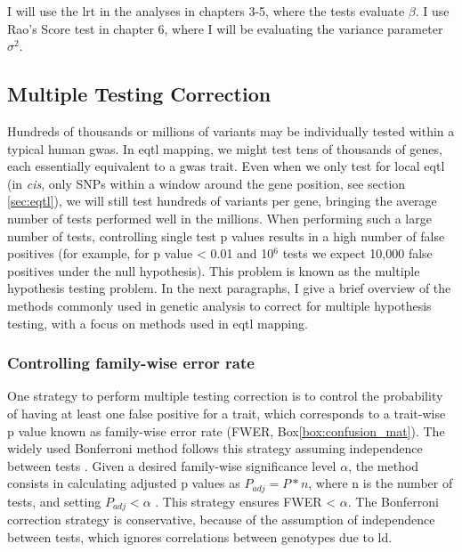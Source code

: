 I will use the \gls{lrt} in the analyses in chapters 3-5, where the tests evaluate $\beta$.
I use Rao's Score test in chapter 6, where I will be evaluating the variance parameter $\sigma^2$.


\subsection{Multiple Testing Correction}
\label{sec:multiple_testing}

Hundreds of thousands or millions of variants may be individually tested within a typical human \gls{gwas}. 
In e\gls{qtl} mapping, we might test tens of thousands of genes, each essentially equivalent to a \gls{gwas} trait. 
Even when we only test for local e\gls{qtl} (in \textit{cis}, only SNPs within a window around the gene position, see section \ref{sec:eqtl}), we will still test hundreds of variants per gene, bringing the average number of tests performed well in the millions.  
When performing such a large number of tests, controlling single test p values results in a high number of false positives (for example, for p value < 0.01 and 10$^6$ tests we expect 10,000 false positives under the null hypothesis). 
This problem is known as the multiple hypothesis testing problem. 
In the next paragraphs, I give a brief overview of the methods commonly used in genetic analysis to correct for multiple hypothesis testing, with a focus on methods used in e\gls{qtl} mapping.

\subsubsection{Controlling family-wise error rate} 

One strategy to perform multiple testing correction is to control the probability of having at least one false positive for a trait, which corresponds to a trait-wise p value known as family-wise error rate (FWER, Box\ref{box:confusion_mat}).
The widely used Bonferroni method follows this strategy assuming independence between tests \cite{laird2010fundamentals}. 
Given a desired family-wise significance level $\alpha$, the method consists in calculating adjusted p values as $P_{adj} = P*n $, where n is the number of tests, and setting $P_{adj} < \alpha$ . 
This strategy ensures FWER < $\alpha$. 
The Bonferroni correction strategy is conservative, because of the assumption of independence between tests, which ignores correlations between genotypes due to \gls{ld}.\\

